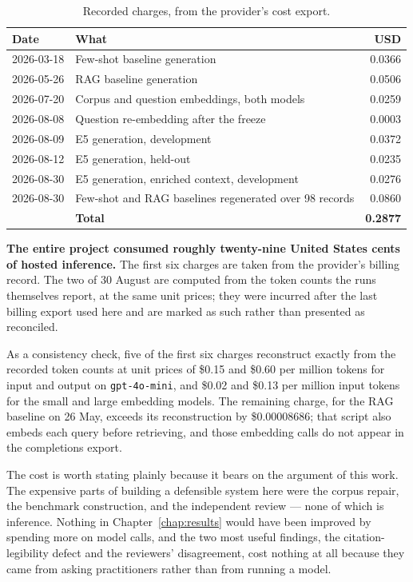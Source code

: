 \begin{table}[htbp]
  \centering
  \caption{Recorded charges, from the provider's cost export.}
  \label{tab:cost}
  \small
  \begin{tabular}{llr}
    \toprule
    \textbf{Date} & \textbf{What} & \textbf{USD} \\
    \midrule
    2026-03-18 & Few-shot baseline generation & 0.0366 \\
    2026-05-26 & RAG baseline generation & 0.0506 \\
    2026-07-20 & Corpus and question embeddings, both models & 0.0259 \\
    2026-08-08 & Question re-embedding after the freeze & 0.0003 \\
    2026-08-09 & E5 generation, development & 0.0372 \\
    2026-08-12 & E5 generation, held-out & 0.0235 \\
    2026-08-30 & E5 generation, enriched context, development & 0.0276 \\
    2026-08-30 & Few-shot and RAG baselines regenerated over 98 records & 0.0860 \\
    \midrule
    & \textbf{Total} & \textbf{0.2877} \\
    \bottomrule
  \end{tabular}
\end{table}

\textbf{The entire project consumed roughly twenty-nine United States cents of
hosted inference.} The first six charges are taken from the provider's billing
record. The two of 30 August are computed from the token counts the runs
themselves report, at the same unit prices; they were incurred after the last
billing export used here and are marked as such rather than presented as
reconciled.

As a consistency check, five of the first six charges reconstruct exactly from the
recorded token counts at unit prices of \$0.15 and \$0.60 per million tokens for
input and output on \texttt{gpt-4o-mini}, and \$0.02 and \$0.13 per million input
tokens for the small and large embedding models. The remaining charge, for the
RAG baseline on 26 May, exceeds its reconstruction by \$0.00008686; that script
also embeds each query before retrieving, and those embedding calls do not appear
in the completions export.

The cost is worth stating plainly because it bears on the argument of this work.
The expensive parts of building a defensible system here were the corpus repair,
the benchmark construction, and the independent review --- none of which is
inference. Nothing in Chapter~\ref{chap:results} would have been improved by
spending more on model calls, and the two most useful findings, the
citation-legibility defect and the reviewers' disagreement, cost nothing at all
because they came from asking practitioners rather than from running a model.

